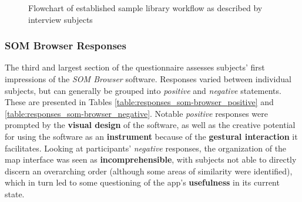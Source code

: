 \begin{figure}[!p]
\caption[Established sample library workflow]{Flowchart of established sample
library workflow as described by interview subjects}
\label{fig:results_current_workflow}
\end{figure}



\subsubsection{SOM Browser Responses}
\label{subsubsec:results_som-browser_responses}
The third and largest section of the questionnaire assesses subjects' first
impressions of the \textit{SOM Browser} software. Responses varied between
individual subjects, but can generally be grouped into \textit{positive} and
\textit{negative} statements. These are presented in Tables
\ref{table:responses_som-browser_positive} and
\ref{table:responses_som-browser_negative}. Notable \textit{positive} responses
were prompted by the \textbf{visual design} of the software, as well as the
creative potential for using the software as an \textbf{instrument} because of
the \textbf{gestural interaction} it facilitates. Looking at participants'
\textit{negative} responses, the organization of the map interface was seen as
\textbf{incomprehensible}, with subjects not able to directly discern an
overarching order (although some areas of similarity were identified), which in
turn led to some questioning of the app's \textbf{usefulness} in its current
state.

\pagebreak

